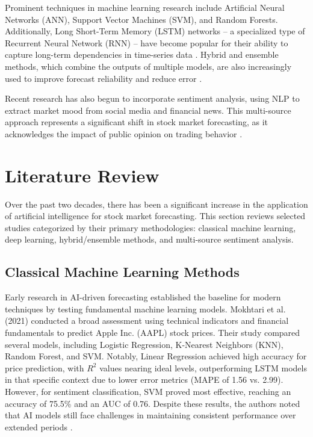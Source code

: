 \documentclass[11pt,a4paper]{article}
\begin{document}
Prominent techniques in machine learning research include Artificial Neural Networks (ANN),
Support Vector Machines (SVM), and Random Forests. Additionally, Long Short-Term Memory
(LSTM) networks -- a specialized type of Recurrent Neural Network (RNN) -- have become popular
for their ability to capture long-term dependencies in time-series data \cite{sheth2023,lin2024}.
Hybrid and ensemble methods, which combine the outputs of multiple models, are also increasingly
used to improve forecast reliability and reduce error \cite{sonkavde2023}.

Recent research has also begun to incorporate sentiment analysis, using NLP to extract market mood
from social media and financial news. This multi-source approach represents a significant shift in
stock market forecasting, as it acknowledges the impact of public opinion on trading behavior
\cite{khan2022,koukaras2022}.

\section{Literature Review}

Over the past two decades, there has been a significant increase in the application of artificial
intelligence for stock market forecasting. This section reviews selected studies categorized by their
primary methodologies: classical machine learning, deep learning, hybrid/ensemble methods, and
multi-source sentiment analysis.

\subsection{Classical Machine Learning Methods}

Early research in AI-driven forecasting established the baseline for modern techniques by testing
fundamental machine learning models. Mokhtari et al. (2021) conducted a broad assessment using
technical indicators and financial fundamentals to predict Apple Inc. (AAPL) stock prices. Their
study compared several models, including Logistic Regression, K-Nearest Neighbors (KNN), Random
Forest, and SVM. Notably, Linear Regression achieved high accuracy for price prediction, with $R^2$
values nearing ideal levels, outperforming LSTM models in that specific context due to lower error
metrics (MAPE of 1.56 vs. 2.99). However, for sentiment classification, SVM proved most effective,
reaching an accuracy of 75.5\% and an AUC of 0.76. Despite these results, the authors noted that AI
models still face challenges in maintaining consistent performance over extended periods
\cite{mokhtari2021}.
\end{document}
